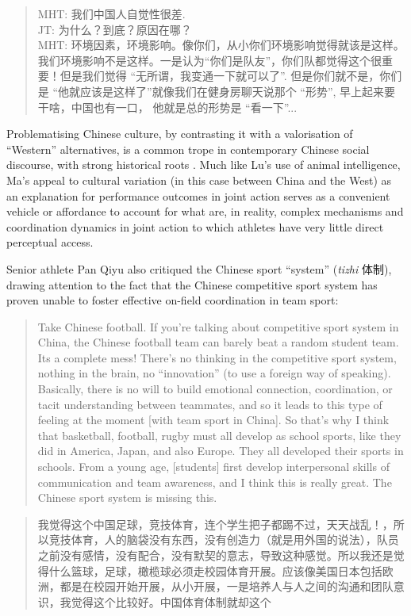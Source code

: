 \begin{CJK}{UTF8}{gbsn}
\begin{quote}
  MHT: 我们中国人自觉性很差. \\
  JT: 为什么？到底？原因在哪？\\
  MHT: 环境因素，环境影响。像你们，从小你们环境影响觉得就该是这样。我们环境影响不是这样。一是认为``你们是队友''，你们队都觉得这个很重要！但是我们觉得 ``无所谓，我变通一下就可以了''. 但是你们就不是，你们是 ``他就应该是这样了''就像我们在健身房聊天说那个 ``形势'', 早上起来要干啥，中国也有一口， 他就是总的形势是  ``看一下''...
\end{quote}

Problematising Chinese culture, by contrasting it with a valorisation of ``Western'' alternatives, is a common trope in contemporary Chinese social discourse, with strong historical roots \citep{Liu1995a}.  Much like Lu's use of animal intelligence, Ma's appeal to cultural variation (in this case between China and the West) as an explanation for performance outcomes in joint action serves as a convenient vehicle or affordance to account for what are, in reality, complex mechanisms and coordination dynamics in joint action to which athletes have very little direct perceptual access.

Senior athlete Pan Qiyu also critiqued the Chinese sport ``system'' (\textit{tizhi} 体制), drawing attention to the fact that the Chinese competitive sport system has proven unable to foster effective on-field coordination in team sport:

\begin{quote}
  Take Chinese football.  If you're talking about competitive sport system in China, the Chinese football team can barely beat a random student team. Its a complete mess! There's no thinking in the competitive sport system, nothing in the brain, no ``innovation'' (to use a foreign way of speaking).  Basically, there is no will to build emotional connection, coordination, or tacit understanding between teammates, and so it leads to this type of feeling at the moment [with team sport in China].  So that's why I think that basketball, football, rugby must all develop as school sports, like they did in America, Japan, and also Europe. They all developed their sports in schools. From a young age, [students] first develop interpersonal skills of communication and team awareness, and I think this is really great.  The Chinese sport system is missing this.
\end{quote}

\begin{quote}
  我觉得这个中国足球，竞技体育，连个学生把子都踢不过，天天战乱！，所以竞技体育，人的脑袋没有东西，没有创造力（就是用外国的说法），队员之前没有感情，没有配合，没有默契的意志，导致这种感觉。所以我还是觉得什么篮球，足球，橄榄球必须走校园体育开展。应该像美国日本包括欧洲，都是在校园开始开展，从小开展，一是培养人与人之间的沟通和团队意识，我觉得这个比较好。中国体育体制就却这个
\end{quote}


\end{CJK}
